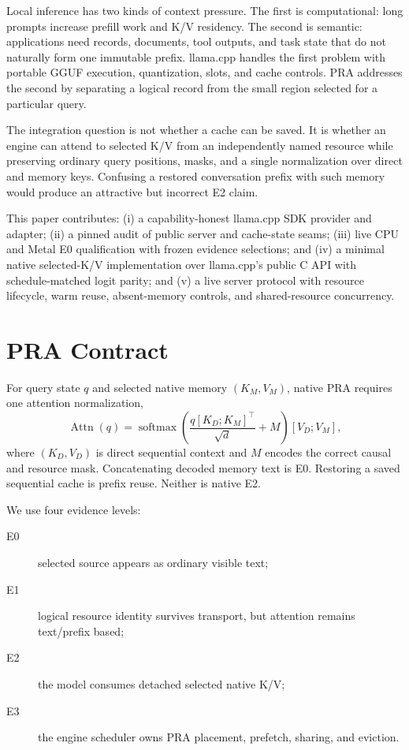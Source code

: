 \documentclass[10pt]{article}
\begin{document}
Local inference has two kinds of context pressure. The first is computational:
long prompts increase prefill work and K/V residency. The second is semantic:
applications need records, documents, tool outputs, and task state that do not
naturally form one immutable prefix. llama.cpp handles the first problem with
portable GGUF execution, quantization, slots, and cache controls. PRA addresses
the second by separating a logical record from the small region selected for a
particular query.

The integration question is not whether a cache can be saved. It is whether an
engine can attend to selected K/V from an independently named resource while
preserving ordinary query positions, masks, and a single normalization over
direct and memory keys. Confusing a restored conversation prefix with such
memory would produce an attractive but incorrect E2 claim.

This paper contributes: (i) a capability-honest llama.cpp SDK provider and
adapter; (ii) a pinned audit of public server and cache-state seams; (iii) live
CPU and Metal E0 qualification with frozen evidence selections; and (iv) a
minimal native selected-K/V implementation over llama.cpp's public C API with
schedule-matched logit parity; and (v) a live server protocol with resource
lifecycle, warm reuse, absent-memory controls, and shared-resource concurrency.

\section{PRA Contract}
For query state $q$ and selected native memory $(K_M,V_M)$, native PRA requires
one attention normalization,
\begin{equation}
 \operatorname{Attn}(q)=
 \operatorname{softmax}\!\left(
 \frac{q[K_D;K_M]^\top}{\sqrt d}+M
 \right)[V_D;V_M],
\end{equation}
where $(K_D,V_D)$ is direct sequential context and $M$ encodes the correct
causal and resource mask. Concatenating decoded memory text is E0. Restoring a
saved sequential cache is prefix reuse. Neither is native E2.

We use four evidence levels:
\begin{description}
\item[E0] selected source appears as ordinary visible text;
\item[E1] logical resource identity survives transport, but attention remains
text/prefix based;
\item[E2] the model consumes detached selected native K/V;
\item[E3] the engine scheduler owns PRA placement, prefetch, sharing, and
eviction.
\end{description}
\end{document}
